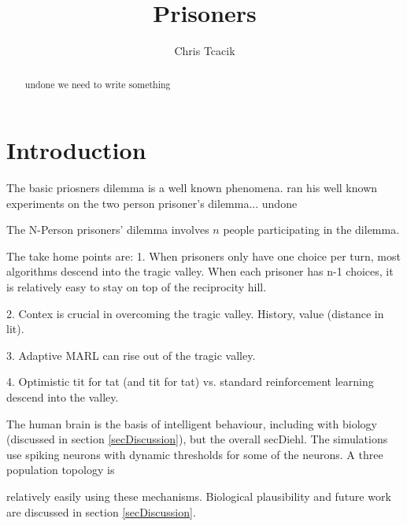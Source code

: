 \documentclass[]{llncs}
\begin{document}
\title{Prisoners}
\author{Chris Tcacik}

\maketitle              


\begin{abstract}
undone we need to write something


\end{abstract}

\section{Introduction}

The basic priosners dilemma is a well known phenomena.  \cite {Axelrod}
ran his well known experiments on the two person prisoner's dilemma... undone

The N-Person prisoners' dilemma involves $n$ people participating in the
dilemma.

The take home points are:
1. When prisoners only have one choice per turn, most algorithms descend into
the tragic valley.  When each prisoner has n-1 choices, it is relatively easy
to stay on top of the reciprocity hill.

2.  Contex is crucial in overcoming the tragic valley. History, value
(distance in lit).

3.  Adaptive MARL can rise out of the tragic valley.

4.  Optimistic tit for tat (and tit for tat) vs. standard reinforcement
learning descend into the valley.  

The human brain is the basis of intelligent behaviour, including
with biology (discussed in section \ref {secDiscussion}), but the overall
{secDiehl}.  The simulations use spiking neurons with dynamic
thresholds for some of the neurons.  A three population topology is

relatively easily using these mechanisms.  Biological plausibility
and future work are discussed in section \ref {secDiscussion}.
\end{document}
